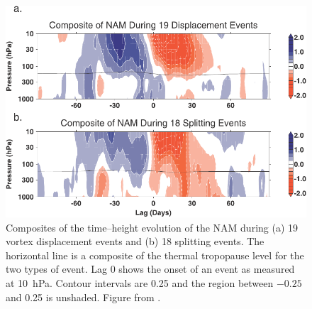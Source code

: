 \begin{figure}
 \centering
 \noindent\includegraphics[width=\textwidth]{figures/chapter-intro/M13.pdf}
 \caption[NAM composite from \citet{Mitchell2013}]{Composites of the
   time--height evolution of the NAM during (a) 19 vortex displacement events
   and (b) 18 splitting events. The horizontal line is a composite of the
   thermal tropopause level for the two types of event. Lag 0 shows the onset of
   an event as measured at 10~hPa. Contour intervals are 0.25 and the region
   between $-0.25$ and 0.25 is unshaded. Figure from \citet{Mitchell2013}. }
 \label{fig:M13}
\end{figure}


